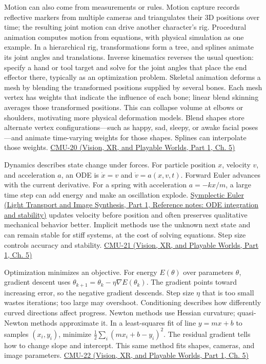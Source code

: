 Motion can also come from measurements or rules. Motion capture records reflective markers from multiple cameras and triangulates their 3D positions over time; the resulting joint motion can drive another character's rig. Procedural animation computes motion from equations, with physical simulation as one example. In a hierarchical rig, transformations form a tree, and splines animate its joint angles and translations. Inverse kinematics reverses the usual question: specify a hand or tool target and solve for the joint angles that place the end effector there, typically as an optimization problem. Skeletal animation deforms a mesh by blending the transformed positions supplied by several bones. Each mesh vertex has weights that indicate the influence of each bone; linear blend skinning averages those transformed positions. This can collapse volume at elbows or shoulders, motivating more physical deformation models. Blend shapes store alternate vertex configurations---such as happy, sad, sleepy, or awake facial poses---and animate time-varying weights for those shapes. Splines can interpolate those weights. \href{../07-Vision-XR-and-Playable-Worlds-P01/main.pdf\#nameddest=04-visual-computing-ii-ch036-cmu-20---introduction-to-animation}{CMU-20 (Vision, XR, and Playable Worlds, Part 1, Ch. 5)}

Dynamics describes state change under forces. For particle position \(x\), velocity \(v\), and acceleration \(a\), an ODE is \(\dot x=v\) and \(\dot v=a(x,v,t)\). Forward Euler advances with the current derivative. For a spring with acceleration \(a=-kx/m\), a large time step can add energy and make an oscillation explode. \href{../04-Light-Transport-and-Image-Synthesis-P01/main.pdf\#nameddest=appendix-18eacf61a04b}{Symplectic Euler (Light Transport and Image Synthesis, Part 1, Reference notes: ODE integration and stability)} updates velocity before position and often preserves qualitative mechanical behavior better. Implicit methods use the unknown next state and can remain stable for stiff systems, at the cost of solving equations. Step size controls accuracy and stability. \href{../07-Vision-XR-and-Playable-Worlds-P01/main.pdf\#nameddest=04-visual-computing-ii-ch036-cmu-21---dynamics-and-time-integration}{CMU-21 (Vision, XR, and Playable Worlds, Part 1, Ch. 5)}

Optimization minimizes an objective. For energy \(E(\theta)\) over parameters \(\theta\), gradient descent uses \(\theta_{k+1}=\theta_k-\eta\nabla E(\theta_k)\). The gradient points toward increasing error, so the negative gradient descends. Step size \(\eta\) that is too small wastes iterations; too large may overshoot. Conditioning describes how differently curved directions affect progress. Newton methods use Hessian curvature; quasi-Newton methods approximate it. In a least-squares fit of line \(y=mx+b\) to samples \((x_i,y_i)\), minimize \(\tfrac12\sum_i(mx_i+b-y_i)^2\). The residual gradient tells how to change slope and intercept. This same method fits shapes, cameras, and image parameters. \href{../07-Vision-XR-and-Playable-Worlds-P01/main.pdf\#nameddest=04-visual-computing-ii-ch036-cmu-22---optimization}{CMU-22 (Vision, XR, and Playable Worlds, Part 1, Ch. 5)}


